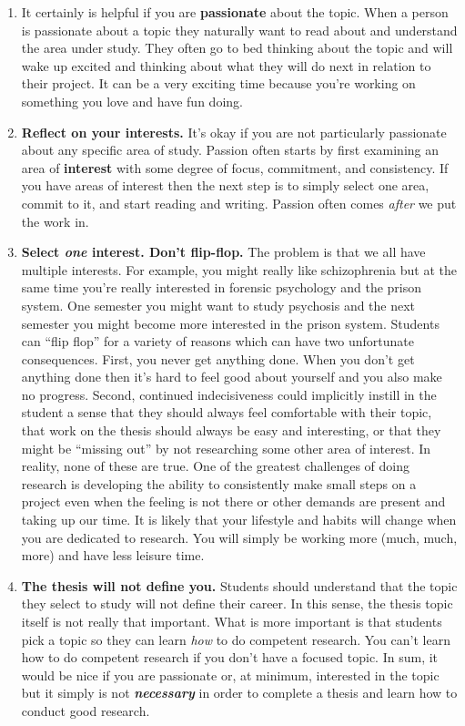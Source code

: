 \documentclass[openany]{book}
\begin{document}
\begin{enumerate}
\def\labelenumi{\arabic{enumi}.}
\item
  It certainly is helpful if you are \textbf{passionate} about the topic. When a person is passionate about a topic they naturally want to read about and understand the area under study. They often go to bed thinking about the topic and will wake up excited and thinking about what they will do next in relation to their project. It can be a very exciting time because you're working on something you love and have fun doing.
\item
  \textbf{Reflect on your interests.} It's okay if you are not particularly passionate about any specific area of study. Passion often starts by first examining an area of \textbf{interest} with some degree of focus, commitment, and consistency. If you have areas of interest then the next step is to simply select one area, commit to it, and start reading and writing. Passion often comes \emph{after} we put the work in.
\item
  \textbf{Select \emph{one} interest. Don't flip-flop.} The problem is that we all have multiple interests. For example, you might really like schizophrenia but at the same time you're really interested in forensic psychology and the prison system. One semester you might want to study psychosis and the next semester you might become more interested in the prison system. Students can ``flip flop'' for a variety of reasons which can have two unfortunate consequences. First, you never get anything done. When you don't get anything done then it's hard to feel good about yourself and you also make no progress. Second, continued indecisiveness could implicitly instill in the student a sense that they should always feel comfortable with their topic, that work on the thesis should always be easy and interesting, or that they might be ``missing out'' by not researching some other area of interest. In reality, none of these are true. One of the greatest challenges of doing research is developing the ability to consistently make small steps on a project even when the feeling is not there or other demands are present and taking up our time. It is likely that your lifestyle and habits will change when you are dedicated to research. You will simply be working more (much, much, more) and have less leisure time.
\item
  \textbf{The thesis will not define you.} Students should understand that the topic they select to study will not define their career. In this sense, the thesis topic itself is not really that important. What is more important is that students pick a topic so they can learn \emph{how} to do competent research. You can't learn how to do competent research if you don't have a focused topic. In sum, it would be nice if you are passionate or, at minimum, interested in the topic but it simply is not \textbf{\emph{necessary}} in order to complete a thesis and learn how to conduct good research.

\end{enumerate}
\end{document}
